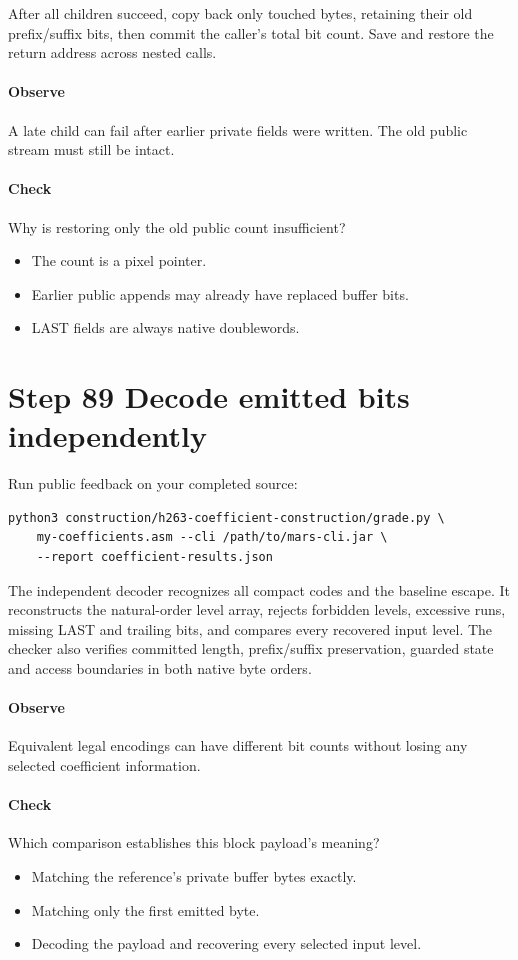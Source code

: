 After all children succeed, copy back only touched bytes, retaining their old
prefix/suffix bits, then commit the caller's total bit count. Save and restore
the return address across nested calls.

\paragraph{Observe} A late child can fail after earlier private fields were written.
The old public stream must still be intact.
\paragraph{Check} Why is restoring only the old public count insufficient?
\begin{itemize}
  \item[A.] The count is a pixel pointer.
  \item[B.] Earlier public appends may already have replaced buffer bits.
  \item[C.] LAST fields are always native doublewords.
\end{itemize}

\section{Step 89 Decode emitted bits independently}\label{h263-coeff-s09}
Run public feedback on your completed source:
\begin{verbatim}
python3 construction/h263-coefficient-construction/grade.py \
    my-coefficients.asm --cli /path/to/mars-cli.jar \
    --report coefficient-results.json
\end{verbatim}
The independent decoder recognizes all compact codes and the baseline escape.
It reconstructs the natural-order level array, rejects forbidden levels, excessive
runs, missing LAST and trailing bits, and compares every recovered input level.
The checker also verifies committed length, prefix/suffix preservation, guarded
state and access boundaries in both native byte orders.

\paragraph{Observe} Equivalent legal encodings can have different bit counts
without losing any selected coefficient information.
\Needspace{8\baselineskip}
\paragraph{Check} Which comparison establishes this block payload's meaning?
\begin{itemize}
  \item[A.] Matching the reference's private buffer bytes exactly.
  \item[B.] Matching only the first emitted byte.
  \item[C.] Decoding the payload and recovering every selected input level.
\end{itemize}

